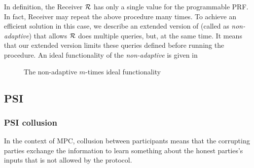 
In  definition, the Receiver $\mathcal{R}$ has only a single value for the programmable PRF. In fact, Receiver may repeat the above procedure many times. To achieve an efficient solution in this case, we describe an extended version of \OPPRF (called as \textit{non-adaptive}) that allows $\mathcal{R}$ does multiple queries, but, at the same time. It means that our extended version limits these queries defined before running the procedure. An ideal functionality of the \textit{non-adaptive} \OPPRF is given in 

\begin{figure}[htb]\centering
\caption{The non-adaptive $m$-times \OPPRF ideal functionality}
\label{fig:nssotfunc}
\end{figure} 


\subsection{PSI }
\subsubsection{PSI collusion}
In the context of MPC, collusion between participants means that the corrupting parties exchange the information to learn something about the honest parties's inputs that is not allowed by the protocol. 
\label{subsec:psicoll}
